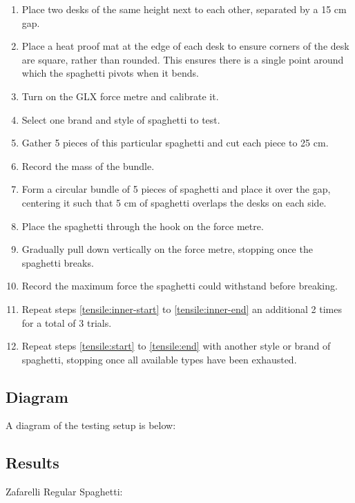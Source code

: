 \documentclass[a4paper,11pt]{article}
\begin{document}
\begin{enumerate}
\item Place two desks of the same height next to each other, separated by a 15
	cm gap.
\item Place a heat proof mat at the edge of each desk to ensure corners of the
	desk are square, rather than rounded. This ensures there is a single
	point around which the spaghetti pivots when it bends.
\item Turn on the GLX force metre and calibrate it.
\item \label{tensile:start} Select one brand and style of spaghetti to test.
\item \label{tensile:inner-start} Gather 5 pieces of this particular spaghetti
	and cut each piece to 25 cm.
\item Record the mass of the bundle.
\item Form a circular bundle of 5 pieces of spaghetti and place it over the gap,
	centering it such that 5 cm of spaghetti overlaps the desks on each side.
\item Place the spaghetti through the hook on the force metre.
\item Gradually pull down vertically on the force metre, stopping once the
	spaghetti breaks.
\item \label{tensile:inner-end} Record the maximum force the spaghetti could
	withstand before breaking.
\item \label{tensile:end} Repeat steps \ref{tensile:inner-start} to
	\ref{tensile:inner-end} an additional 2 times for a total of 3 trials.
\item Repeat steps \ref{tensile:start} to \ref{tensile:end} with another
	style or brand of spaghetti, stopping once all available types have been
	exhausted.
\end{enumerate}


\subsection{Diagram}

A diagram of the testing setup is below:

\vspace{5cm}


\subsection{Results}

Zafarelli Regular Spaghetti:
\end{document}
